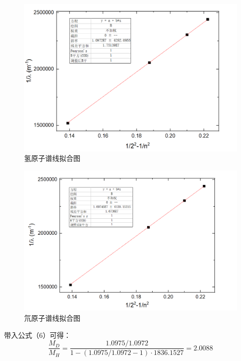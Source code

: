 \documentclass{report}
\begin{document}
 \begin{figure}
	\centering
	\includegraphics[scale=0.5]{R_H拟合}
	\caption{\heiti{}氢原子谱线拟合图}
	
\end{figure}
 \begin{figure}
	\centering
	\includegraphics[scale=0.5]{R_D拟合}
	\caption{\heiti{}氘原子谱线拟合图}
	
\end{figure}


带入公式（6）可得：
\begin{equation}
	\frac{M_D}{M_H}=\dfrac{1.0975/1.0972}{1-(1.0975/1.0972-1)\cdot1836.1527}=2.0088\nonumber
\end{equation}
\end{document}

